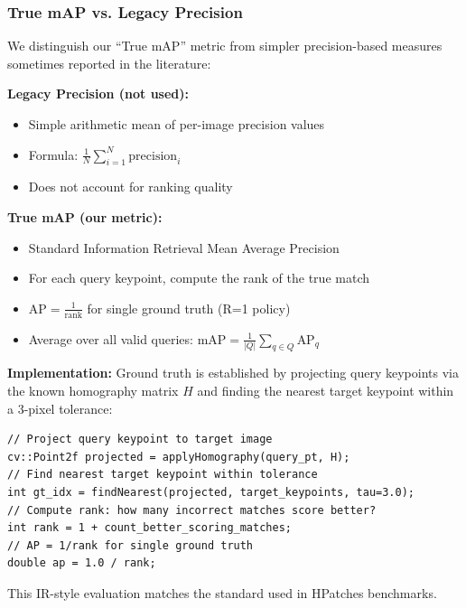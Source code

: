 \subsubsection{True mAP vs. Legacy Precision}

We distinguish our ``True mAP'' metric from simpler precision-based measures sometimes reported in the literature:

\textbf{Legacy Precision (not used):}
\begin{itemize}
    \item Simple arithmetic mean of per-image precision values
    \item Formula: $\frac{1}{N}\sum_{i=1}^{N} \text{precision}_i$
    \item Does not account for ranking quality
\end{itemize}

\textbf{True mAP (our metric):}
\begin{itemize}
    \item Standard Information Retrieval Mean Average Precision
    \item For each query keypoint, compute the rank of the true match
    \item $\text{AP} = \frac{1}{\text{rank}}$ for single ground truth (R=1 policy)
    \item Average over all valid queries: $\text{mAP} = \frac{1}{|Q|}\sum_{q \in Q} \text{AP}_q$
\end{itemize}

\textbf{Implementation:} Ground truth is established by projecting query keypoints via the known homography matrix $H$ and finding the nearest target keypoint within a 3-pixel tolerance:
\begin{verbatim}
// Project query keypoint to target image
cv::Point2f projected = applyHomography(query_pt, H);
// Find nearest target keypoint within tolerance
int gt_idx = findNearest(projected, target_keypoints, tau=3.0);
// Compute rank: how many incorrect matches score better?
int rank = 1 + count_better_scoring_matches;
// AP = 1/rank for single ground truth
double ap = 1.0 / rank;
\end{verbatim}

This IR-style evaluation matches the standard used in HPatches benchmarks.

